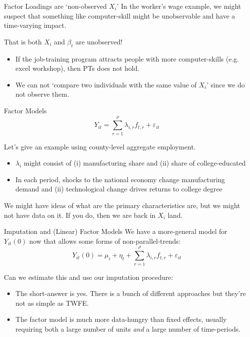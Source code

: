 \documentclass[aspectratio=169,t,11pt,table]{beamer}
\begin{document}
\begin{frame}{Factor Loadings are `non-observed $X_i$'}
  In the worker's wage example, we might suspect that something like computer-skill might be unobservable and have a time-varying impact. 
  
  \bigskip That is both $X_i$ and $\beta_t$ are unobserved!

  \begin{itemize}
    \item If the job-training program attracts people with more computer-skills (e.g. excel workshop), then PTs does not hold.
    \item We can not `compare two individuals with the same value of $X_i$' since we do not observe them.
  \end{itemize}
\end{frame}

\begin{frame}{Factor Models}
  $$
    Y_{it} = \sum_{r=1}^\rho \lambda_{i, r} f_{t, r} + \varepsilon_{it}
  $$

  \bigskip
  Let's give an example using county-level aggregate employment. 
  \begin{itemize}
    \item $\lambda_i$ might consist of (i) manufacturing share and (ii) share of college-educated
    \item In each period, shocks to the national economy change manufacturing demand and (ii) technological change drives returns to college degree 
  \end{itemize}

  \pause
  \bigskip 
  We might have ideas of what are the primary characteristics are, but we might not have data on it. If you do, then we are back in $X_i$ land.
\end{frame}

\begin{frame}{Imputation and (Linear) Factor Models}
  We have a more-general model for $Y_{it}(0)$ now that allows some forms of non-parallel-trends:
  $$
    Y_{it}(0) =  \mu_i + \eta_t + \sum_{r=1}^\rho \lambda_{i, r} f_{t, r} + \varepsilon_{it}
  $$

  \bigskip\bigskip
  Can we estimate this and use our imputation procedure:
  \begin{itemize}
    \item The short-answer is yes. There is a bunch of different approaches but they're not as simple as TWFE. 

    \item The factor model is much more data-hungry than fixed effects, usually requiring both a large number of units \emph{ and } a large number of time-periods.
  \end{itemize}
\end{frame}
\end{document}
